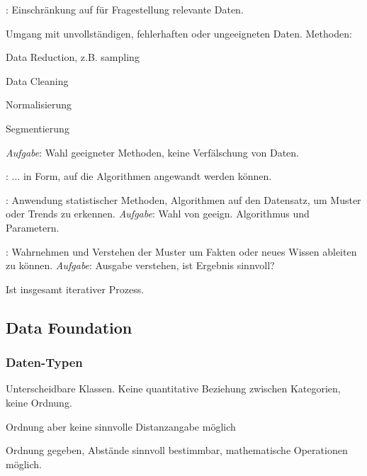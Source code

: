 \documentclass[10pt]{article} %
\begin{document}
\begin{definition} 
\begin{cptenumerate} 
      \item {}: Einschränkung auf für Fragestellung relevante Daten.
      \item {} Umgang mit unvollständigen, fehlerhaften
        oder ungeeigneten Daten. Methoden:
      \begin{cptitemize} 
            \item Data Reduction, z.B. sampling 
            \item Data Cleaning 
            \item Normalisierung 
            \item Segmentierung
      \end{cptitemize}
      \textit{Aufgabe}: Wahl geeigneter Methoden, keine Verfälschung von
      Daten.
    \item {}: ... in Form, auf die Algorithmen
      angewandt werden können. 
    \item {}: Anwendung statistischer Methoden, Algorithmen
      auf den Datensatz, um Muster oder Trends zu erkennen.
      \textit{Aufgabe}: Wahl von geeign. Algorithmus und Parametern.
    \item {}: Wahrnehmen und Verstehen der Muster um
      Fakten oder neues Wissen ableiten zu können. \textit{Aufgabe}: Ausgabe
      verstehen, ist Ergebnis sinnvoll?
\end{cptenumerate} 
Ist insgesamt iterativer Prozess.
\end{definition}


\subsection{Data Foundation}

\subsubsection{Daten-Typen}

\begin{cptitemize} 
\item {} Unterscheidbare Klassen. Keine quantitative Beziehung zwischen Kategorien, keine Ordnung. 
\item {} Ordnung aber keine sinnvolle Distanzangabe möglich 
\item {} Ordnung gegeben, Abstände sinnvoll bestimmbar, mathematische Operationen möglich. 
\end{cptitemize}
\end{document}
